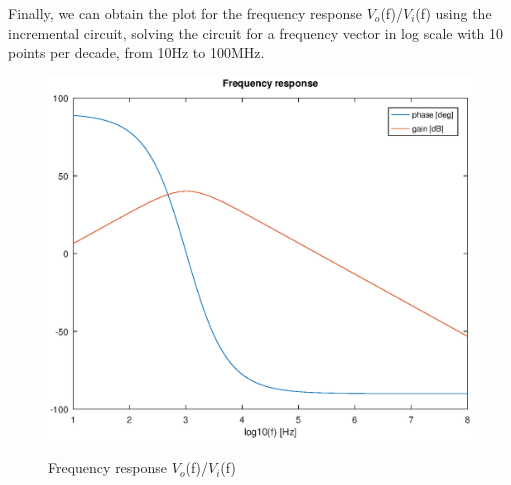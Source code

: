 Finally, we can obtain the plot for the frequency response $V_o$(f)/$V_i$(f) using the incremental circuit, solving the circuit for a frequency vector in log scale with 10 points per decade, from 10Hz to 100MHz.

\begin{figure}[!ht] \centering
\caption{Frequency response $V_o$(f)/$V_i$(f)}
\includegraphics[width=0.8\linewidth]{theory.eps}
\label{fig:theoretical}
\end{figure}


  





